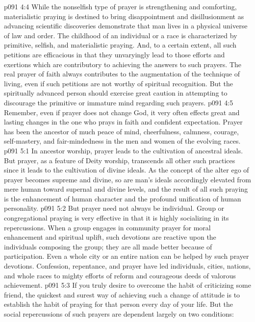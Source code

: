 \vs p091 4:4 While the nonselfish type of prayer is strengthening and comforting, materialistic praying is destined to bring disappointment and disillusionment as advancing scientific discoveries demonstrate that man lives in a physical universe of law and order. The childhood of an individual or a race is characterized by primitive, selfish, and materialistic praying. And, to a certain extent, all such petitions are efficacious in that they unvaryingly lead to those efforts and exertions which are contributory to achieving the answers to such prayers. The real prayer of faith always contributes to the augmentation of the technique of living, even if such petitions are not worthy of spiritual recognition. But the spiritually advanced person should exercise great caution in attempting to discourage the primitive or immature mind regarding such prayers.
\vs p091 4:5 \pc Remember, even if prayer does not change God, it very often effects great and lasting changes in the one who prays in faith and confident expectation. Prayer has been the ancestor of much peace of mind, cheerfulness, calmness, courage, self\hyp{}mastery, and fair\hyp{}mindedness in the men and women of the evolving races.
\vs p091 5:1 In ancestor worship, prayer leads to the cultivation of ancestral ideals. But prayer, as a feature of Deity worship, transcends all other such practices since it leads to the cultivation of divine ideals. As the concept of the alter ego of prayer becomes supreme and divine, so are man’s ideals accordingly elevated from mere human toward supernal and divine levels, and the result of all such praying is the enhancement of human character and the profound unification of human personality.
\vs p091 5:2 But prayer need not always be individual. Group or congregational praying is very effective in that it is highly socializing in its repercussions. When a group engages in community prayer for moral enhancement and spiritual uplift, such devotions are reactive upon the individuals composing the group; they are all made better because of participation. Even a whole city or an entire nation can be helped by such prayer devotions. Confession, repentance, and prayer have led individuals, cities, nations, and whole races to mighty efforts of reform and courageous deeds of valorous achievement.
\vs p091 5:3 \pc If you truly desire to overcome the habit of criticizing some friend, the quickest and surest way of achieving such a change of attitude is to establish the habit of praying for that person every day of your life. But the social repercussions of such prayers are dependent largely on two conditions:
